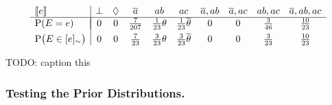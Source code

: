 \documentclass{article}
\newcommand{\at}[1]{\ensuremath{\!\del{#1}}}
\newcommand{\co}[1]{\ensuremath{\overline{#1}}}
\newcommand{\stablecore}[1]{\ensuremath{\left\llbracket #1 \right\rrbracket}}
\newcommand{\prfunc}{\ensuremath{\mathrm{P}}}
\newcommand{\pr}[1]{\ensuremath{\prfunc\at{#1}}}
\newcommand{\class}[1]{\ensuremath{[{#1}]_{\sim}}}
\newcommand{\inconsistent}{\bot}
\newcommand{\indepclass}{\ensuremath{\Diamond}}
\begin{document}
\begin{table*}[t]
	\begin{equation}
		\begin{array}{l|ccccccccc}
			\stablecore{e}          &
			\inconsistent           &
			\indepclass             &
			\co{a}                  &
			ab                      &
			ac                      &
			\co{a}, ab              &
			\co{a}, ac              &
			ab, ac                  &
			\co{a}, ab, ac
			\\ \hline\\[-12pt]

			\pr{E = e}              &
			0                       &
			0                       &
			\frac{7}{207}           &
			\frac{1}{23}\theta      &
			\frac{1}{23}\co{\theta} &
			0                       &
			0                       &
			\frac{3}{46}            &
			\frac{10}{23}
			\\[4pt]

			\pr{E \in \class{e}}    &
			0                       &
			0                       &
			\frac{7}{23}            &
			\frac{3}{23}\theta      &
			\frac{3}{23}\co{\theta} &
			0                       &
			0                       &
			\frac{3}{23}            &
			\frac{10}{23}
		\end{array}\label{eq:sbf.prior}
	\end{equation}
	\caption{TODO: caption this}\label{tab:events.classes.prior.ditribution}
\end{table*}
%
%
%
\subsubsection*{Testing the Prior Distributions.}
%
%
%
\end{document}
